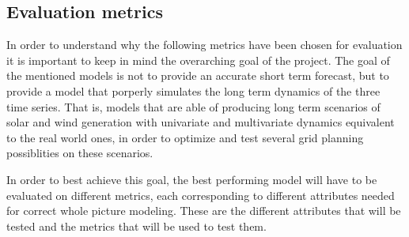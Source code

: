\subsection{Evaluation metrics}
\label{s:evaluation-metrics}
In order to understand why the following metrics have been chosen for evaluation it is important to keep in mind the overarching goal of the project. The goal of the mentioned models is not to provide an accurate short term forecast, but to provide a model that porperly simulates the long term dynamics of the three time series. That is, models that are able of producing long term scenarios of solar and wind generation with univariate and multivariate dynamics equivalent to the real world ones, in order to optimize and test several grid planning possiblities on these scenarios. 

In order to best achieve this goal, the best performing model will have to be evaluated on different metrics, each corresponding to different attributes needed for correct whole picture modeling. These are the different attributes that will be tested and the metrics that will be used to test them. 


